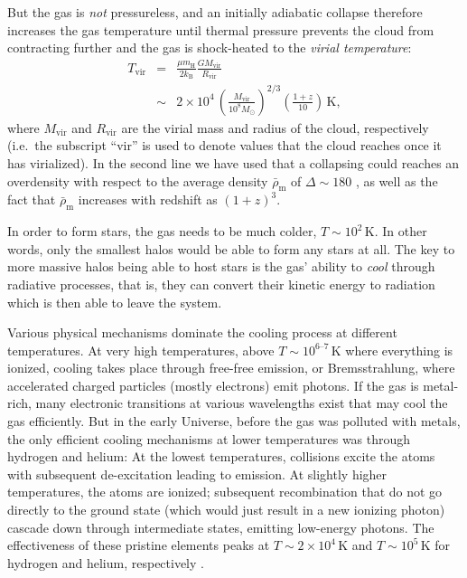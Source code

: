 \documentclass[useAMS,usenatbib,bibyear]{aa}
\begin{document}
But the gas is \emph{not} pressureless, and an initially adiabatic collapse therefore increases the gas temperature until thermal pressure prevents the cloud from contracting further and the gas is shock-heated to the \emph{virial temperature}:
\begin{eqnarray}
    \label{eq:Tvir}
    \nonumber
    T_\mathrm{vir} & = & \frac{\mu m_\mathrm{H}}{2 k_\mathrm{B}} \frac{G M_\mathrm{vir}}{R_\mathrm{vir}}\\
    & \sim & 2\times10^4 \, \left( \frac{M_\mathrm{vir}}{10^8M_\odot} \right)^{2/3}
          \left( \frac{1+z}{10} \right) \, \mathrm{K},
\end{eqnarray}
where $M_\mathrm{vir}$ and $R_\mathrm{vir}$ are the virial mass and radius of the cloud, respectively (i.e.~the subscript ``vir'' is used to denote values that the cloud reaches once it has virialized).
In the second line we have used that a collapsing could reaches an overdensity with respect to the average density $\bar{\rho}_\mathrm{m}$ of $\Delta\sim180$ \citep[e.g.][]{Binney2008}, as well as the fact that $\bar{\rho}_\mathrm{m}$ increases with redshift as $(1+z)^3$.

In order to form stars, the gas needs to be much colder, $T\sim10^2\,\mathrm{K}$.
In other words, only the smallest halos would be able to form any stars at all.
The key to more massive halos being able to host stars is the gas' ability to \emph{cool} through radiative processes, that is, they can convert their kinetic energy to radiation which is then able to leave the system.

Various physical mechanisms dominate the cooling process at different temperatures.
At very high temperatures, above $T\sim10^{6\text{--}7}\,\mathrm{K}$ where everything is ionized, cooling takes place through free-free emission, or Bremsstrahlung, where accelerated charged particles (mostly electrons) emit photons.
If the gas is metal-rich, many electronic transitions at various wavelengths exist that may cool the gas efficiently.
But in the early Universe, before the gas was polluted with metals, the only efficient cooling mechanisms at lower temperatures was through hydrogen and helium:
At the lowest temperatures, collisions excite the atoms with subsequent de-excitation leading to emission.
At slightly higher temperatures, the atoms are ionized; subsequent recombination that do not go directly to the ground state (which would just result in a new ionizing photon) cascade down through intermediate states, emitting low-energy photons.
The effectiveness of these pristine elements peaks at $T\sim2\times10^4\,\mathrm{K}$ and $T\sim10^5\,\mathrm{K}$ for hydrogen and helium, respectively \citep[see e.g.][]{Katz1996}.
\end{document}
